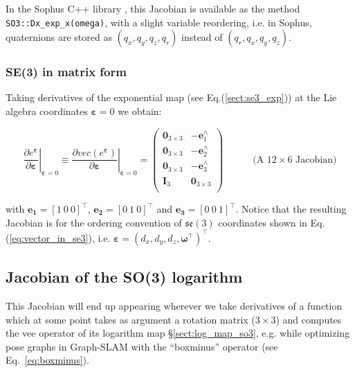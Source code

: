 \documentclass[a4paper,11pt]{report}
\newcommand{\E}{{\bm{\varepsilon}}}
\newcommand{\W}{{\bm{\omega}}}
\newcommand{\hatop}[1]{#1^\wedge}
\begin{document}
In the Sophus C++ library \cite{sophus}, this Jacobian is available as the method \texttt{SO3::Dx\_exp\_x(omega)}, 
with a slight variable reordering, i.e. in Sophus, quaternions are stored as $(q_x,q_y,q_z,q_r)$ instead of $(q_r,q_x,q_y,q_z)$.

\subsubsection{SE(3) in matrix form}

Taking derivatives of the exponential map (see Eq.(\ref{sect:se3_exp})) at the Lie algebra coordinates $\E=0$ we obtain:

\begin{equation}
\left. \frac{\partial e^\E}{\partial \E} \right|_{\E=0}
\equiv
\left. \frac{\partial vec(e^\E)}{\partial \E} \right|_{\E=0}
=
\left(
\begin{array}{cc}
 \mathbf{0}_{3\times 3}  & -\hatop{\mathbf{e}}_1 \\
 \mathbf{0}_{3\times 3}  & -\hatop{\mathbf{e}}_2 \\
 \mathbf{0}_{3\times 3}  & -\hatop{\mathbf{e}}_3 \\
 \mathbf{I}_{3}  & \mathbf{0}_{3\times 3} \\
\end{array}
\right)
\quad\quad\quad \text{(A $12 \times 6$ Jacobian)}
\end{equation}

\noindent with $\mathbf{e_1}=[1 ~ 0 ~ 0]^\top$,
$\mathbf{e_2}=[0 ~ 1 ~ 0]^\top$ and
$\mathbf{e_3}=[0 ~ 0 ~ 1]^\top$.
Notice that the resulting Jacobian is for the
ordering convention of $\mathfrak{se}(3)$ coordinates shown in Eq.(\ref{eq:vector_in_se3}), i.e. $\E = (d_x, d_y, d_z, \W^\top)^\top$.



\subsection{Jacobian of the SO(3) logarithm}
\label{sect:eq:jacob_dLnROT_dROT}

This Jacobian will end up appearing wherever we take derivatives of a function which at some point takes
as argument a rotation matrix ($3\times 3$) and computes the vee operator of its logarithm map \S\ref{sect:log_map_so3},
e.g. while optimizing pose graphs in Graph-SLAM with the 
``boxminus'' operator (see Eq.~\ref{eq:boxminus}).
\end{document}
